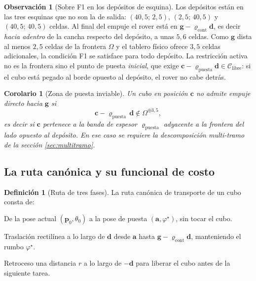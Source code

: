\documentclass[11pt,a4paper]{article}
\newtheorem{corolario}[teorema]{Corolario}
\theoremstyle{definition}
\newtheorem{definicion}[teorema]{Definición}
\newtheorem{observacion}[teorema]{Observación}
\newcommand{\dd}{\mathbf{d}}
\newcommand{\cc}{\mathbf{c}}
\newcommand{\pp}{\mathbf{p}}
\newcommand{\gv}{\mathbf{g}}
\newcommand{\aaa}{\mathbf{a}}
\begin{document}
\begin{observacion}[Sobre F1 en los depósitos de esquina]
Los depósitos están en las tres esquinas que no son la de salida:
$(40{,}5;\,2{,}5)$, $(2{,}5;\,40{,}5)$ y $(40{,}5;\,40{,}5)$ celdas. Al final del empuje
el rover está en $\gv - \varrho_{\mathrm{cont}}\dd$, es decir \emph{hacia adentro} de la
cancha respecto del depósito, a unas $5{,}6$ celdas. Como $\gv$ dista al menos
$2{,}5$ celdas de la frontera $\Omega$ y el tablero físico ofrece $3{,}5$ celdas
adicionales, la condición F1 se satisface para todo depósito. La restricción activa no
es la frontera sino el punto de puesta \emph{inicial}, que exige
$\cc - \varrho_{\mathrm{puesta}}\dd \in \mathcal C_{\mathrm{libre}}$: si el cubo está
pegado al borde opuesto al depósito, el rover no cabe detrás.
\end{observacion}

\begin{corolario}[Zona de puesta inviable]
Un cubo en posición $\cc$ no admite empuje directo hacia $\gv$ si
\begin{equation}
  \cc - \varrho_{\mathrm{puesta}}\,\dd \notin \Omega^{\oplus 3{,}5},
\end{equation}
es decir si $\cc$ pertenece a la banda de espesor $\varrho_{\mathrm{puesta}}$ adyacente a
la frontera del lado opuesto al depósito. En ese caso se requiere la descomposición
multi-tramo de la sección \ref{sec:multitramo}.
\end{corolario}

\subsection{La ruta canónica y su funcional de costo}

\begin{definicion}[Ruta de tres fases]
La ruta canónica de transporte de un cubo consta de:
\begin{description}[leftmargin=2.6em,style=nextline,font=\normalfont\itshape]
\item[Fase A --- aproximación.] De la pose actual $(\pp_0,\theta_0)$ a la pose de puesta
      $(\aaa, \varphi^\star)$, sin tocar el cubo.
\item[Fase B --- empuje.] Traslación rectilínea a lo largo de $\dd$ desde $\aaa$ hasta
      $\gv - \varrho_{\mathrm{cont}}\dd$, manteniendo el rumbo $\varphi^\star$.
\item[Fase C --- retirada.] Retroceso una distancia $r$ a lo largo de $-\dd$ para
      liberar el cubo antes de la siguiente tarea.
\end{description}
\end{definicion}
\end{document}
